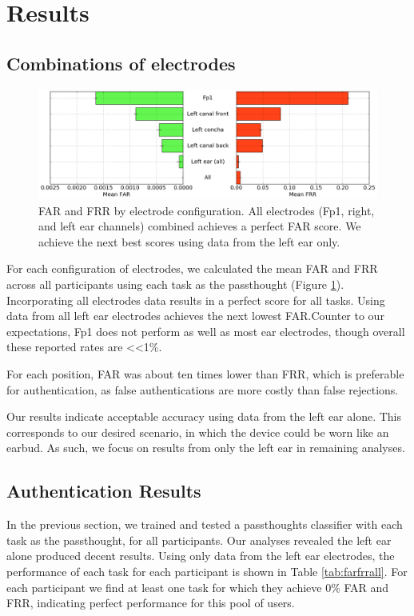 \documentclass{sigchi}
\begin{document}
\section{Results}
\subsection{Combinations of electrodes}

\begin{figure}[t]
\centering
\includegraphics[width=.9\linewidth]{./figures/mean-far-and-frr-by-electrode-config.png}
\caption{FAR and FRR by electrode configuration. All electrodes (Fp1, right, and left ear channels) combined achieves a perfect FAR score. We achieve the next best scores using data from the left ear only.}
\label{fig:meanByElectrode}
\end{figure}

For each configuration of electrodes, we calculated the mean FAR and FRR across all participants using each task as the passthought (Figure \ref{fig:meanByElectrode}). Incorporating all electrodes data results in a perfect score for all tasks. Using data from all left ear electrodes achieves the next lowest FAR.Counter to our expectations, Fp1 does not perform as well as most ear electrodes, though overall these reported rates are \textless\textless 1\%. 

For each position, FAR was about ten times lower than FRR, which is preferable for authentication, as false authentications are more costly than false rejections.

Our results indicate acceptable accuracy using data from the left ear alone. This corresponds to our desired scenario, in which the device could be worn like an earbud. As such, we focus on results from only the left ear in remaining analyses.

\subsection{Authentication Results}

In the previous section, we trained and tested a passthoughts classifier with each task as the passthought, for all participants. Our analyses revealed the left ear alone produced decent results. Using only data from the left ear electrodes, the performance of each task for each participant is shown in Table \ref{tab:farfrrall}. For each participant we find at least one task for which they achieve 0\% FAR and FRR, indicating perfect performance for this pool of users.
\end{document}
